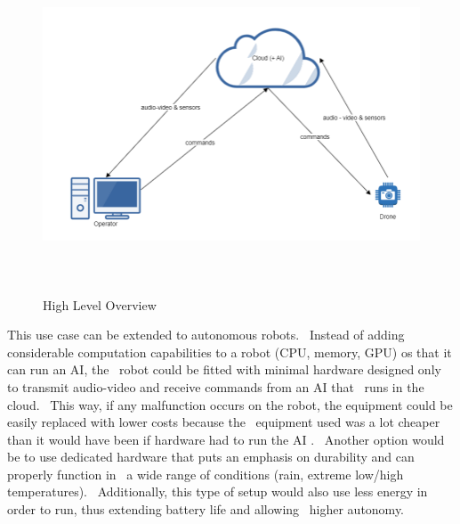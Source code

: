 \begin{figure}[ht]
    \label{fig:overview1}
    \includegraphics[width=15cm, height=10cm, keepaspectratio]{img/overview1.PNG}
    \caption{High Level Overview}
\end{figure}

This use case can be extended to autonomous robots. \
Instead of adding considerable computation capabilities to a robot (CPU, memory, GPU) os that it can run an AI, the \
robot could be fitted with minimal hardware designed only to transmit audio-video and receive commands from an AI that \
runs in the cloud. \
This way, if any malfunction occurs on the robot, the equipment could be easily replaced with lower costs because the \
equipment used was a lot cheaper than it would have been if hardware had to run the AI . \
Another option would be to use dedicated hardware that puts an emphasis on durability and can properly function in \
a wide range of conditions (rain, extreme low/high temperatures). \
Additionally, this type of setup would also use less energy in order to run, thus extending battery life and allowing \
higher autonomy.


